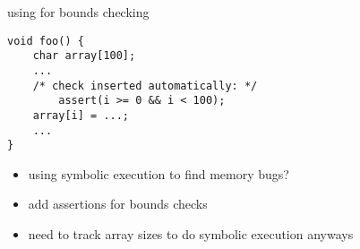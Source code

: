 \begin{frame}[fragile,label=symToBounds]{using for bounds checking}
\lstset{language=C,style=smaller}
\begin{lstlisting}
void foo() {
    char array[100];
    ...
    /* check inserted automatically: */
        assert(i >= 0 && i < 100);
    array[i] = ...;
    ...
}
\end{lstlisting}
\begin{itemize}
\item using symbolic execution to find memory bugs?
\item add assertions for bounds checks
\item need to track array sizes to do symbolic execution anyways
\end{itemize}
\end{frame}
